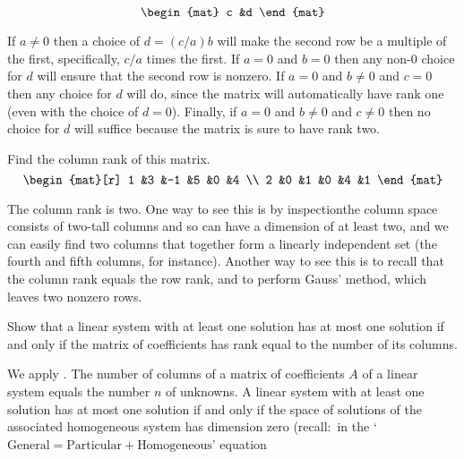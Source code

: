 \begin{exercises}
\begin{equation*}
\begin{mat}
         c  &d
      \end{mat}
    \end{equation*}
    \begin{answer}
      If \( a\neq 0 \) then a choice of \( d=(c/a)b \) will make the second
      row be a multiple of the first, specifically, \( c/a \) times the first.
      If \( a=0 \) and \( b=0 \) then any non-\( 0 \) choice for \( d \) 
      will ensure that
      the second row is nonzero.
      If \( a=0 \) and \( b\neq 0 \) and \( c=0 \) then any choice for \( d \)
      will do, since the matrix will automatically have rank one (even with
      the choice of $d=0$).
      Finally, if \( a=0 \) and \( b\neq 0 \) and \( c\neq 0 \) then
      no choice for \( d \) will suffice because the matrix is sure to have 
      rank two.   
    \end{answer}
  \item 
    Find the column rank of this matrix.
    \begin{equation*}
      \begin{mat}[r]
        1  &3  &-1  &5  &0  &4  \\
        2  &0  &1   &0  &4  &1
      \end{mat}
    \end{equation*}
    \begin{answer}
      The column rank is two.
      One way to see this is by inspection\Dash the column space consists of
      two-tall columns and so can have a dimension of at least two, and we
      can easily find two columns that together form a linearly independent
      set (the fourth and fifth columns, for instance).
      Another way to see this is to recall that 
      the column rank equals the row rank, and to perform Gauss' method, 
      which leaves two nonzero rows.
    \end{answer}
  \item 
    Show that a linear system with at least one solution has at most 
    one solution if
    and only if the matrix of coefficients has rank equal to the number of
    its columns.
    \begin{answer}
      We apply .  
      The number of columns of a matrix of coefficients $A$ of a linear 
      system equals the number $n$ of unknowns.
      A linear system with at least one solution has at most one solution
      if and only if the space of solutions of the associated homogeneous
      system has dimension zero (recall:~in the 
      `$\text{General}=\text{Particular}+\text{Homogeneous}$' equation

\end{answer}
\end{exercises}
